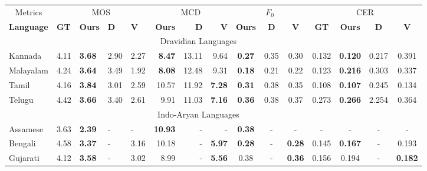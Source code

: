 \documentclass{article}
\begin{document}
\begin{table*}[ht]
\centering
\begingroup
\setlength{\tabcolsep}{6pt} \renewcommand{\arraystretch}{0.8} \begin{tabular}{@{}lllllrrrccccccc@{}}
\toprule
\multicolumn{1}{c}{Metrics} & \multicolumn{4}{c}{MOS}                               & \multicolumn{3}{c}{MCD}                                    & \multicolumn{3}{c}{$F_0$}                                    & \multicolumn{4}{c}{CER}             \\ 
\cmidrule(l){1-1} \cmidrule(l){2-5} \cmidrule(l){6-8} \cmidrule(l){9-11} \cmidrule(l){12-14} 
\textbf{Language}                    & \textbf{GT} & \textbf{Ours} & \textbf{D} & \textbf{V} & \textbf{Ours}  & \textbf{D} & \textbf{V}                            & \textbf{Ours} & \textbf{D} & \textbf{V}                           & \textbf{GT} & \textbf{Ours}  & \textbf{D} & \textbf{V}     \\
\midrule
\multicolumn{14}{c}{Dravidian Languages}                           \\
\midrule
Kannada    & 4.11 & \textbf{3.68} & 2.90 & 2.27 & \textbf{8.47}  & 13.11 & 9.64          & \textbf{0.27} & 0.35 & 0.30         & 0.132 & \textbf{0.120} & 0.217 & 0.391          \\
Malayalam  & 4.24 & \textbf{3.64} & 3.49 & 1.92 & \textbf{8.08}  & 12.48 & 9.31          & \textbf{0.18} & 0.21 & 0.22         & 0.123 & \textbf{0.216} & 0.303 & 0.337          \\
Tamil      & 4.16 & \textbf{3.84} & 3.01 & 2.59 & 10.57          & 11.92 & \textbf{7.28} & \textbf{0.31} & 0.38 & 0.35         & 0.108 & \textbf{0.107} & 0.245 & 0.134          \\
Telugu     & 4.42 & \textbf{3.66} & 3.40 & 2.61 & 9.91           & 11.03 & \textbf{7.16} & \textbf{0.36} & 0.38 & 0.37         & 0.273 & \textbf{0.266} & 2.254 & 0.364          \\
\midrule
\multicolumn{14}{c}{Indo-Aryan Languages}                                                                           \\ 
\midrule
Assamese   & 3.63 & \textbf{2.39} & -    & -    & \textbf{10.93} & -     & -             & \textbf{0.38} & -    & -            & - & -              & -     & -              \\
Bengali    & 4.58 & \textbf{3.37} & -    & 3.16 & 10.18          & -     & \textbf{5.97} & \textbf{0.28} & -    & \textbf{0.28} & 0.145 & \textbf{0.167} & -     & 0.193          \\
Gujarati   & 4.12 & \textbf{3.58} & -    & 3.02 & 8.99           & -     & \textbf{5.56} & 0.38          & -    & \textbf{0.36} & 0.156 & 0.194          & -     & \textbf{0.182} \\

\end{tabular}
\end{table*}
\end{document}
